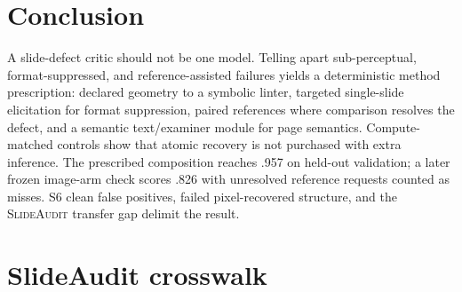 \documentclass[10pt]{article}
\newcommand{\g}[1]{\textsf{#1}}        %
\begin{document}
\section{Conclusion}

A slide-defect critic should not be one model. Telling apart sub-perceptual, format-suppressed, and
reference-assisted failures yields a deterministic method prescription: declared geometry to a symbolic
linter, targeted single-slide elicitation for format suppression, paired references where comparison resolves
the defect, and a semantic text/examiner module for page semantics. Compute-matched controls show that atomic
recovery is not purchased with extra inference. The prescribed composition reaches .957 on held-out validation;
a later frozen image-arm check scores .826 with unresolved reference requests counted as misses. \g{S6} clean false positives, failed pixel-recovered structure,
and the \textsc{SlideAudit} transfer gap delimit the result.

\appendix
\section{SlideAudit crosswalk}\label{app:slideaudit-crosswalk}
\end{document}

